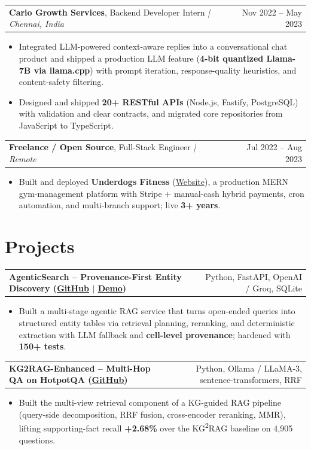 \documentclass[letterpaper,11pt]{article}
\makeatletter
\newcommand{\expItem}[4]{%
  \vspace{3pt}
  \begin{tabular*}{\textwidth}{@{}l@{\extracolsep{\fill}}r@{}}
    \textbf{#1}, #2 \textit{| #3} & #4 \\
  \end{tabular*}\par\vspace{-2pt}
}
\newcommand{\projItem}[2]{%
  \vspace{6pt}
  \begin{tabular*}{\textwidth}{@{}l@{\extracolsep{\fill}}r@{}}
    \textbf{#1} & #2 \\
  \end{tabular*}\par\vspace{-2pt}
}
\makeatother
\begin{document}
\expItem{Cario Growth Services}{Backend Developer Intern}{Chennai, India}{Nov 2022 -- May 2023}
\begin{itemize}
  \item Integrated LLM-powered context-aware replies into a conversational chat product and shipped a production LLM feature (\textbf{4-bit quantized Llama-7B via llama.cpp}) with prompt iteration, response-quality heuristics, and content-safety filtering.
  \item Designed and shipped \textbf{20+ RESTful APIs} (Node.js, Fastify, PostgreSQL) with validation and clear contracts, and migrated core repositories from JavaScript to TypeScript.
\end{itemize}

\expItem{Freelance / Open Source}{Full-Stack Engineer}{Remote}{Jul 2022 -- Aug 2023}
\begin{itemize}
  \item Built and deployed \textbf{Underdogs Fitness} (\href{https://www.underdogsfitness.in/}{Website}), a production MERN gym-management platform with Stripe + manual-cash hybrid payments, cron automation, and multi-branch support; live \textbf{3+ years}.
\end{itemize}

\section{Projects}

\projItem{AgenticSearch -- Provenance-First Entity Discovery {\normalfont\small(\href{https://github.com/Deva-1903/ciir_agentic_search}{GitHub} $\vert$ \href{https://agentic-search-negglszkwa-uc.a.run.app}{Demo})}}{Python, FastAPI, OpenAI / Groq, SQLite}
\begin{itemize}
  \item Built a multi-stage agentic RAG service that turns open-ended queries into structured entity tables via retrieval planning, reranking, and deterministic extraction with LLM fallback and \textbf{cell-level provenance}; hardened with \textbf{150+ tests}.
\end{itemize}

\projItem{KG2RAG-Enhanced -- Multi-Hop QA on HotpotQA {\normalfont\small(\href{https://github.com/Deva-1903/KG2RAG-685-NLP}{GitHub})}}{Python, Ollama / LLaMA-3, sentence-transformers, RRF}
\begin{itemize}
  \item Built the multi-view retrieval component of a KG-guided RAG pipeline (query-side decomposition, RRF fusion, cross-encoder reranking, MMR), lifting supporting-fact recall \textbf{+2.68\%} over the KG\textsuperscript{2}RAG baseline on 4{,}905 questions.
\end{itemize}
\end{document}
